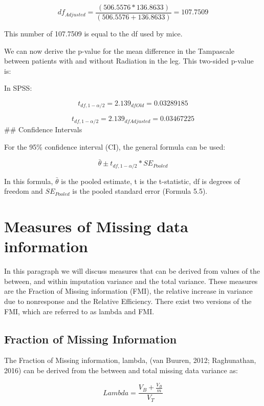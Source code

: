 \documentclass[]{book}
\theoremstyle{definition}
\theoremstyle{definition}
\theoremstyle{definition}
\theoremstyle{remark}
\begin{document}
\[df_{Adjusted} = \frac{(506.5576* 136.8633)}{(506.5576+ 136.8633)}=107.7509\]

This number of 107.7509 is equal to the df used by mice.

We can now derive the p-value for the mean difference in the Tampascale
between patients with and without Radiation in the leg. This two-sided
p-value is:

In SPSS:

\[t_{df,1-\alpha/2}=2.139_{df{Old}}=0.03289185\]

\[t_{df,1-\alpha/2}=2.139_{df{Adjusted}}=0.03467225\] \#\# Confidence
Intervals

For the 95\% confidence interval (CI), the general formula can be used:

\begin{equation}
\bar{\theta} ± t_{df,1-\alpha/2} * SE_{Pooled}
  \label{eq:conf}
\end{equation}

In this formula, \(\bar{\theta}\) is the pooled estimate, t is the
t-statistic, df is degrees of freedom and \(SE_{Pooled}\) is the pooled
standard error (Formula 5.5).

\section{Measures of Missing data
information}\label{measures-of-missing-data-information}

In this paragraph we will discuss measures that can be derived from
values of the between, and within imputation variance and the total
variance. These measures are the Fraction of Missing information (FMI),
the relative increase in variance due to nonresponse and the Relative
Efficiency. There exist two versions of the FMI, which are referred to
as lambda and FMI.

\subsection{Fraction of Missing
Information}\label{fraction-of-missing-information}

The Fraction of Missing information, lambda, (van Buuren, 2012;
Raghunathan, 2016) can be derived from the between and total missing
data variance as:

\begin{equation}
Lambda = \frac{V_B + \frac{V_B}{m}}{V_T}
  \label{eq:lambda}
\end{equation}
\end{document}
